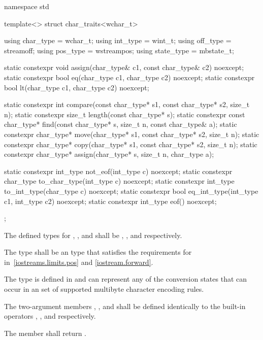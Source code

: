 %
\begin{codeblock}
namespace std {
  template<> struct char_traits<wchar_t> {
    using char_type  = wchar_t;
    using int_type   = wint_t;
    using off_type   = streamoff;
    using pos_type   = wstreampos;
    using state_type = mbstate_t;

    static constexpr void assign(char_type& c1, const char_type& c2) noexcept;
    static constexpr bool eq(char_type c1, char_type c2) noexcept;
    static constexpr bool lt(char_type c1, char_type c2) noexcept;

    static constexpr int compare(const char_type* s1, const char_type* s2, size_t n);
    static constexpr size_t length(const char_type* s);
    static constexpr const char_type* find(const char_type* s, size_t n,
                                           const char_type& a);
    static constexpr char_type* move(char_type* s1, const char_type* s2, size_t n);
    static constexpr char_type* copy(char_type* s1, const char_type* s2, size_t n);
    static constexpr char_type* assign(char_type* s, size_t n, char_type a);

    static constexpr int_type not_eof(int_type c) noexcept;
    static constexpr char_type to_char_type(int_type c) noexcept;
    static constexpr int_type to_int_type(char_type c) noexcept;
    static constexpr bool eq_int_type(int_type c1, int_type c2) noexcept;
    static constexpr int_type eof() noexcept;
  };
}
\end{codeblock}

\pnum
The defined types for
,
,
and
shall be
,
,
and
respectively.

\pnum
The type
shall be an  type that satisfies the requirements
for  in~\ref{iostreams.limits.pos} and \ref{iostream.forward}.

\pnum
The type
is defined in
and can represent any of the conversion states that can occur in an  set of supported multibyte character encoding rules.

\pnum
The two-argument members
,
,
and
shall be defined identically
to the built-in operators
\tcode{=},
\tcode{==},
and
\tcode{<}
respectively.

\pnum
The member
shall return
.


